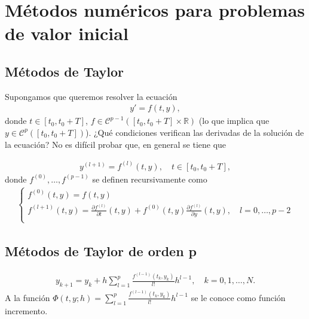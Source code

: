 \chapter{Métodos numéricos para problemas de valor inicial}

\section{Métodos de Taylor}
Supongamos que queremos resolver la ecuación
\begin{align*}
    y' = f(t,y) ,
\end{align*}
donde $t \in [t_0,t_0 + T]$, $f \in \mathcal{C}^{p-1}([t_0,t_0+T] \times \mathbb{R})$ (lo que implica que $y \in \mathcal{C}^p([t_0,t_0+T])$). ¿Qué condiciones verifican las derivadas de la solución de la ecuación? No es difícil probar que, en general se tiene que

\begin{align*}
    y^{(l+1)} = f^{(l)}(t,y), \quad t \in [t_0,t_0+T],
\end{align*}
donde $f^{(0)},\ldots,f^{(p-1)}$ se definen recursivamente como
\begin{align*}
    \left\{ \begin{array}{lcc}
                f^{(0)}(t,y) = f(t,y)                                                                                                                    \\
                f^{(l+1)}(t,y) = \frac{\partial f^{(l)}}{\partial t}(t,y) + f^{(0)}(t,y)\frac{\partial f^{(l)}}{\partial y}(t,y), \quad l = 0,\ldots,p-2 \\
            \end{array}
    \right.
\end{align*}

\section{Métodos de Taylor de orden p}

\begin{align*}
    \boxed{
        y_{k+1} = y_k + h\sum_{l=1}^{p} \frac{f^{(l-1)}(t_k,y_k)}{l!} h^{l-1}, \quad k = 0,1,\ldots,N.
    }
\end{align*}
A la función $\Phi(t,y;h) = \sum_{l=1}^{p} \frac{f^{(l-1)}(t_k,y_k)}{l!} h^{l-1}$ se le conoce como función incremento.

